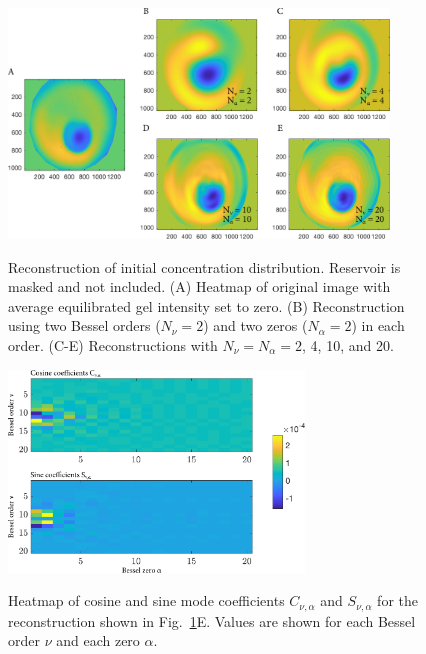 \begin{figure}
\caption[Reconstruction of initial concentration distribution.]{Reconstruction of initial concentration distribution. Reservoir is masked and not included.  (A) Heatmap of original image with average equilibrated gel intensity set to zero. (B) Reconstruction using two Bessel orders ($N_\nu = 2$) and two zeros ($N_\alpha = 2$) in each order. (C-E) Reconstructions with $N_\nu = N_\alpha = 2$, 4, 10, and 20.}
\centering
\includegraphics[width=0.9\textwidth]{figs/ch04/reconstruction-16_2_4_10_20.pdf}
\label{fig:initDist}
\end{figure} 

\begin{figure}
\caption[Heatmap of mode coefficients.]{Heatmap of cosine and sine mode coefficients $C_{\nu,\alpha}$ and $S_{\nu,\alpha}$ for the reconstruction shown in Fig.~\ref{fig:initDist}E. Values are shown for each Bessel order $\nu$ and each zero $\alpha$. \\}
\centering
\includegraphics[width=0.7\textwidth]{figs/ch04/rec_16_cos_sin_array_20_terms.pdf}
\label{fig:arrays}
\end{figure} 

